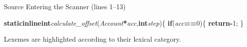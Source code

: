 \documentclass[aspectratio=169]{beamer}
\newcommand{\KW}[1]{\textcolor{keywordcolor}{\textbf{#1}}}
\newcommand{\ID}[1]{\textcolor{identifiercolor}{\textit{#1}}}
\newcommand{\INT}[1]{\colorbox{integercolor!15}{\textcolor{integercolor}{#1}}}
\newcommand{\OP}[1]{\textcolor{operatorcolor}{\textbf{#1}}}
\newcommand{\DELIM}[1]{\textcolor{delimitercolor}{#1}}
\begin{document}
\begin{frame}[fragile]{Source Entering the Scanner (lines 1--13)}
\begin{block}{}
\KW{static}\hspace*{0.18em}\KW{inline}\hspace*{0.18em}\KW{int}\hspace*{0.18em}\ID{calculate\_offset}\DELIM{(}\ID{Account}\hspace*{0.18em}\OP{*}\ID{acc}\DELIM{,}\hspace*{0.18em}\KW{int}\hspace*{0.18em}\ID{step}\DELIM{)}\hspace*{0.18em}\DELIM{\{}
\hspace*{0.18em}\hspace*{0.18em}\hspace*{0.18em}\hspace*{0.18em}\KW{if}\hspace*{0.18em}\DELIM{(}\ID{acc}\hspace*{0.18em}\OP{==}\hspace*{0.18em}\INT{0}\DELIM{)}\hspace*{0.18em}\DELIM{\{}
\hspace*{0.18em}\hspace*{0.18em}\hspace*{0.18em}\hspace*{0.18em}\hspace*{0.18em}\hspace*{0.18em}\hspace*{0.18em}\hspace*{0.18em}\KW{return}\hspace*{0.18em}\OP{-}\INT{1}\DELIM{;}
\hspace*{0.18em}\hspace*{0.18em}\hspace*{0.18em}\hspace*{0.18em}\DELIM{\}}
\end{block}
\vspace{0.1cm}
{\tiny Lexemes are highlighted according to their lexical category.}
\end{frame}
\end{document}
